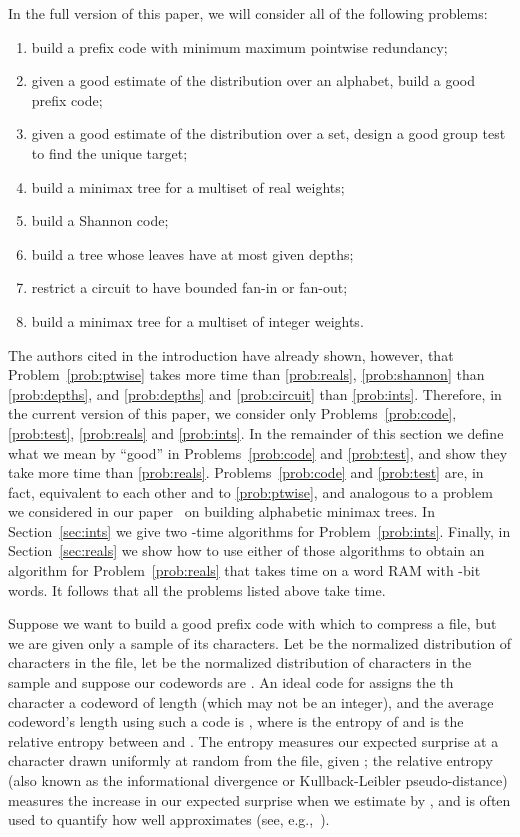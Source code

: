 \documentclass[runningheads]{llncs}
\begin{document}
In the full version of this paper, we will consider all of the following problems:
\begin{enumerate}
\renewcommand{\theenumi}{\Alph{enumi}}
\item \label{prob:ptwise}
    build a prefix code with minimum maximum pointwise redundancy;
\item \label{prob:code}
    given a good estimate of the distribution over an alphabet, build a good prefix code;
\item \label{prob:test}
    given a good estimate of the distribution over a set, design a good group test to find the unique target;
\item \label{prob:reals}
    build a minimax tree for a multiset of real weights;
\item \label{prob:shannon}
    build a Shannon code;
\item \label{prob:depths}
    build a tree whose leaves have at most given depths;
\item \label{prob:circuit}
    restrict a circuit to have bounded fan-in or fan-out;
\item \label{prob:ints}
    build a minimax tree for a multiset of integer weights.
\end{enumerate}
The authors cited in the introduction have already shown, however, that Problem~\ref{prob:ptwise} takes  more time than \ref{prob:reals}, \ref{prob:shannon} than \ref{prob:depths}, and \ref{prob:depths} and \ref{prob:circuit} than \ref{prob:ints}.  Therefore, in the current version of this paper, we consider only Problems~\ref{prob:code}, \ref{prob:test}, \ref{prob:reals} and \ref{prob:ints}.  In the remainder of this section we define what we mean by ``good'' in Problems~\ref{prob:code} and \ref{prob:test}, and show they take  more time than \ref{prob:reals}.  Problems~\ref{prob:code} and \ref{prob:test} are, in fact, equivalent to each other and to \ref{prob:ptwise}, and analogous to a problem we considered in our paper~\cite{Gag??} on building alphabetic minimax trees.  In Section~\ref{sec:ints} we give two -time algorithms for Problem~\ref{prob:ints}.  Finally, in Section~\ref{sec:reals} we show how to use either of those algorithms to obtain an algorithm for Problem~\ref{prob:reals} that takes  time on a word RAM with -bit words.  It follows that all the problems listed above take  time.

Suppose we want to build a good prefix code with which to compress a file, but we are given only a sample of its characters.  Let  be the normalized distribution of characters in the file, let  be the normalized distribution of characters in the sample and suppose our codewords are .  An ideal code for  assigns the th character a codeword of length  (which may not be an integer), and the average codeword's length using such a code is , where  is the entropy of  and  is the relative entropy between  and .  The entropy measures our expected surprise at a character drawn uniformly at random from the file, given ; the relative entropy (also known as the informational divergence or Kullback-Leibler pseudo-distance) measures the increase in our expected surprise when we estimate  by , and is often used to quantify how well  approximates  (see, e.g.,~\cite{CT06}).
\end{document}
